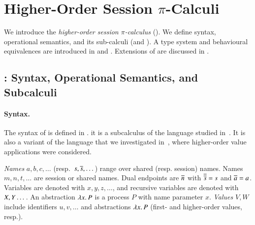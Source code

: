 \documentclass[runningheads]{llncs}
\begin{document}
%

\section{Higher-Order Session $\pi$-Calculi}
\label{sec:calculus}

We introduce 
the \emph{higher-order session $\pi$-calculus} (\HOp).
We define 
syntax, operational semantics, and 
its sub-calculi (\sessp and \HO).
A type system and behavioural equivalences are introduced in 
 and . 
Extensions of \HOp %
are discussed in .




\subsection{\HOp: Syntax, Operational Semantics, and Subcalculi}
\label{subsec:syntax}

\paragraph{Syntax.}
The syntax of \HOp is defined in .
\HOp it is a subcalculus of the language studied 
in~\cite{tlca07}. It is also a variant of the language that we investigated in~\cite{characteristic_bis}, 
where higher-order value applications were considered. 




\emph{Names} $a,b,c, \dots$ (resp.~$s, \overline{s}, \dots$) 
range over shared (resp. session) names. 
Names $m, n, t, \dots$ are session or shared names.
Dual endpoints are $\overline{n}$ with
$\overline{\overline{s}} = s$ and $\overline{a} = a$.
Variables are denoted with $x, y, z, \dots$, 
and recursive variables are denoted with $X, Y \dots$.
An abstraction %
$\lambda x.\,P$ is a process $P$ with name parameter $x$.
\emph{Values} $V,W$ include 
identifiers $u, v, \ldots$ %
and 
abstractions $\lambda x.\,P$ (first- and higher-order values, resp.). 
\end{document}
